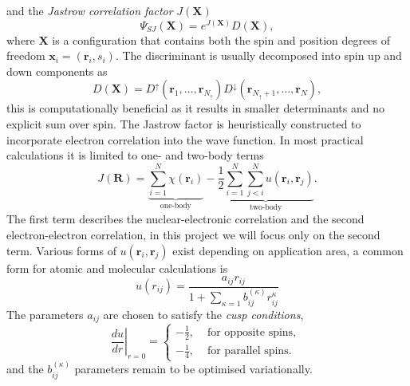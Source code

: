 \documentclass[final,3p,times,twocolumn]{elsarticle}
\begin{document}
	and the \emph{Jastrow correlation factor} $J(\mathbf{X})$
	\begin{equation}
		\Psi_{SJ}(\mathbf{X})=e^{J(\mathbf{X})} D(\mathbf{X}),
	\end{equation}
	where $\mathbf{X}$ is a configuration that contains both the spin and position degrees of freedom $\mathbf{x}_i = (\mathbf{r}_i, s_i)$. The discriminant is usually decomposed into spin up and down components as
	\begin{equation}
		D(\mathbf{X}) = D^{\uparrow}\left(\mathbf{r}_{1}, \ldots, \mathbf{r}_{N_{\uparrow}}\right) D^{\downarrow}\left(\mathbf{r}_{N_{\uparrow}+1}, \ldots, \mathbf{r}_{N}\right),
	\end{equation}
	this is computationally beneficial as it results in smaller determinants and no explicit sum over spin.
	The Jastrow factor is heuristically constructed to incorporate electron correlation into the wave function. In most practical calculations it is limited to one- and two-body terms~\cite{foulkes2001quantum}
	\begin{equation}
		\label{eq:jast}
		J(\mathbf{R})=
		\underbrace{\sum_{i=1}^{N} \chi\left(\mathbf{r}_{i}\right)}_{\text{one-body}}
		-
		\underbrace{\frac{1}{2} \sum_{i=1}^{N} \sum_{j<i}^{N} u\left(\mathbf{r}_{i}, \mathbf{r}_{j}\right)}_{\text{two-body}}.
	\end{equation}
	The first term describes the nuclear-electronic correlation and the second electron-electron correlation, in this project we will focus only on the second term. 
	Various forms of $u(\mathbf{r}_{i}, \mathbf{r}_{j})$ exist depending on application area, a common form for atomic and molecular calculations is
	\begin{equation}
		\label{eq:u}
		u(r_{ij})=\frac{a_{ij} r_{ij}}{1+\sum_{\kappa=1} b^{(\kappa)}_{ij} r^\kappa_{ij}}
	\end{equation}
	The parameters $a_{ij}$ are chosen to satisfy the \emph{cusp conditions},  
	\begin{equation}
		\left.\frac{d u}{d r}\right|_{r=0}=\left\{\begin{array}{cl}-\frac{1}{2}, & \text { for opposite spins, } \\ -\frac{1}{4}, & \text { for parallel spins. }\end{array}\right.
	\end{equation}
	and the $b^{(\kappa)}_{ij}$ parameters remain to be optimised variationally. 
	
\end{document}
